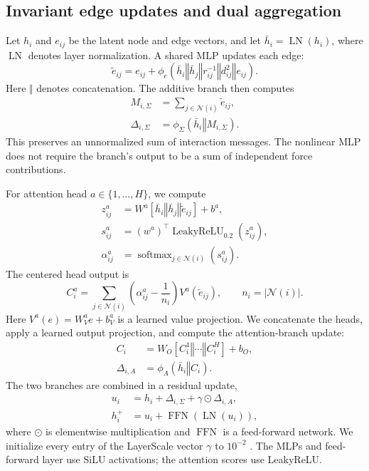 \documentclass[10pt,letterpaper,twocolumn]{article}
\newcommand{\LN}{\operatorname{LN}}
\newcommand{\FFN}{\operatorname{FFN}}
\newcommand{\softmax}{\operatorname{softmax}}
\newcommand{\cat}{\mathbin{\Vert}}
\newcommand{\cN}{\mathcal N}
\numberwithin{equation}{section}
\begin{document}
\subsection{Invariant edge updates and dual aggregation}

Let $h_i$ and $e_{ij}$ be the latent node and edge vectors, and let $\bar h_i=\LN(h_i)$, where
$\LN$ denotes layer normalization. A shared MLP updates each edge:
\begin{equation}
\widetilde e_{ij}=e_{ij}+\phi_e\!\left(
\bar h_i\cat\bar h_j\cat r_{ij}^{-1}\cat d_{ij}^2\cat e_{ij}\right).
\label{eq:edge}
\end{equation}
Here $\cat$ denotes concatenation. The additive branch then computes
\begin{equation}
\begin{aligned}
M_{i,\Sigma}&=\sum_{j\in\cN(i)}\widetilde e_{ij},\\
\Delta_{i,\Sigma}&=\phi_\Sigma(\bar h_i\cat M_{i,\Sigma}).
\end{aligned}
\label{eq:sum}
\end{equation}
This preserves an unnormalized sum of interaction messages. The nonlinear MLP does
not require the branch's output to be a sum of independent force contributions.

For attention head $a\in\{1,\ldots,H\}$, we compute
\begin{equation}
\begin{aligned}
z_{ij}^a&=W^a[\bar h_i\cat\bar h_j\cat\widetilde e_{ij}]+b^a,\\
s_{ij}^a&=(w^a)^\top\operatorname{LeakyReLU}_{0.2}(z_{ij}^a),\\
\alpha_{ij}^a&=\softmax_{j\in\cN(i)}(s_{ij}^a).
\end{aligned}
\label{eq:score}
\end{equation}
The centered head output is
\begin{equation}
C_i^a=\sum_{j\in\cN(i)}\left(\alpha_{ij}^a-\frac{1}{n_i}\right)
V^a(\widetilde e_{ij}),\qquad n_i=|\cN(i)|.
\label{eq:center}
\end{equation}
Here $V^a(e)=W_V^a e+b_V^a$ is a learned value projection. We concatenate the heads,
apply a learned output projection, and compute the attention-branch update:
\begin{equation}
\begin{aligned}
C_i&=W_O[C_i^1\cat\cdots\cat C_i^H]+b_O,\\
\Delta_{i,A}&=\phi_A(\bar h_i\cat C_i).
\end{aligned}
\label{eq:attnupdate}
\end{equation}
The two branches are combined in a residual update,
\begin{equation}
\begin{aligned}
u_i&=h_i+\Delta_{i,\Sigma}+\gamma\odot\Delta_{i,A},\\
h_i^+&=u_i+\FFN(\LN(u_i)),
\end{aligned}
\label{eq:node}
\end{equation}
where $\odot$ is elementwise multiplication and $\FFN$ is a feed-forward network. We initialize
every entry of the LayerScale vector $\gamma$ to $10^{-2}$ \citep{touvron2021going}. The MLPs and
feed-forward layer use SiLU activations; the attention scores use LeakyReLU.
\end{document}
